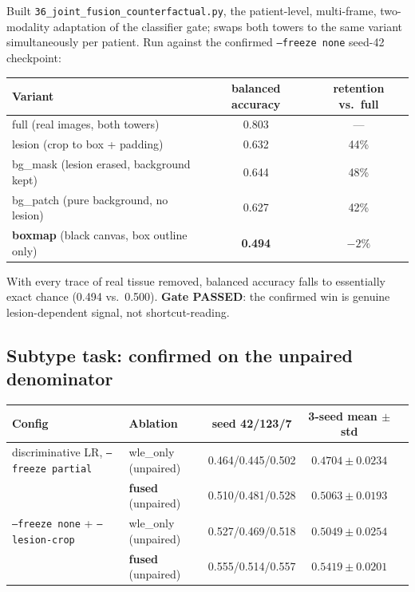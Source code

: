 \documentclass[10pt]{article}
\begin{document}
Built \texttt{36\_joint\_fusion\_counterfactual.py}, the patient-level, multi-frame, two-modality adaptation
of the classifier gate; swaps both towers to the same variant simultaneously per patient. Run against the
confirmed \texttt{--freeze none} seed-42 checkpoint:

\begin{center}
\begin{tabular}{lcc}
\toprule
Variant & balanced accuracy & retention vs.\ full \\
\midrule
full (real images, both towers) & 0.803 & --- \\
lesion (crop to box + padding) & 0.632 & 44\% \\
bg\_mask (lesion erased, background kept) & 0.644 & 48\% \\
bg\_patch (pure background, no lesion) & 0.627 & 42\% \\
\textbf{boxmap} (black canvas, box outline only) & \textbf{0.494} & \textbf{$-2\%$} \\
\bottomrule
\end{tabular}
\end{center}

With every trace of real tissue removed, balanced accuracy falls to essentially exact chance (0.494 vs.\
0.500). \textbf{Gate PASSED}: the confirmed win is genuine lesion-dependent signal, not shortcut-reading.

\subsection{Subtype task: confirmed on the unpaired denominator}

\begin{center}
\begin{tabular}{llccc}
\toprule
Config & Ablation & seed 42/123/7 & \textbf{3-seed mean $\pm$ std} \\
\midrule
discriminative LR, \texttt{--freeze partial} & wle\_only (unpaired) & 0.464/0.445/0.502 & $0.4704\pm0.0234$ \\
& \textbf{fused} (unpaired) & 0.510/0.481/0.528 & $\mathbf{0.5063\pm0.0193}$ \\
\texttt{--freeze none} + \texttt{--lesion-crop} & wle\_only (unpaired) & 0.527/0.469/0.518 & $0.5049\pm0.0254$ \\
& \textbf{fused} (unpaired) & 0.555/0.514/0.557 & $\mathbf{0.5419\pm0.0201}$ \\
\bottomrule
\end{tabular}
\end{center}
\end{document}
